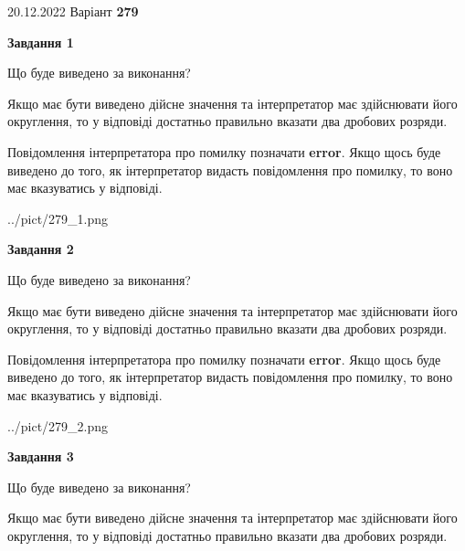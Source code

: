 \documentclass[12pt, ukrainian]{article}
\begin{document}
{20.12.2022 Варіант \No \textbf { 279 }\par}
{
\begin {Large}

{\begin {center}\textbf{Завдання 1}\end {center}}\par
Що буде виведено за виконання? \par

Якщо має бути виведено дійсне значення та інтерпретатор має здійснювати його округлення, 
то у відповіді достатньо правильно вказати два дробових розряди.

Повідомлення інтерпретатора про помилку позначати \textbf{error}.
Якщо щось буде виведено до того, як інтерпретатор видасть повідомлення про помилку, 
то воно має вказуватись у відповіді. \par

\begin{center}
	{../pict/279_1.png}
\end{center}
\newpage

{\begin {center}\textbf{Завдання 2}\end {center}}\par
Що буде виведено за виконання? \par

Якщо має бути виведено дійсне значення та інтерпретатор має здійснювати його округлення, 
то у відповіді достатньо правильно вказати два дробових розряди.

Повідомлення інтерпретатора про помилку позначати \textbf{error}.
Якщо щось буде виведено до того, як інтерпретатор видасть повідомлення про помилку, 
то воно має вказуватись у відповіді. \par

\begin{center}
	{../pict/279_2.png}
\end{center}
\newpage

{\begin {center}\textbf{Завдання 3}\end {center}}\par
Що буде виведено за виконання? \par

Якщо має бути виведено дійсне значення та інтерпретатор має здійснювати його округлення, 
то у відповіді достатньо правильно вказати два дробових розряди.


\end{Large}}
\end{document}
